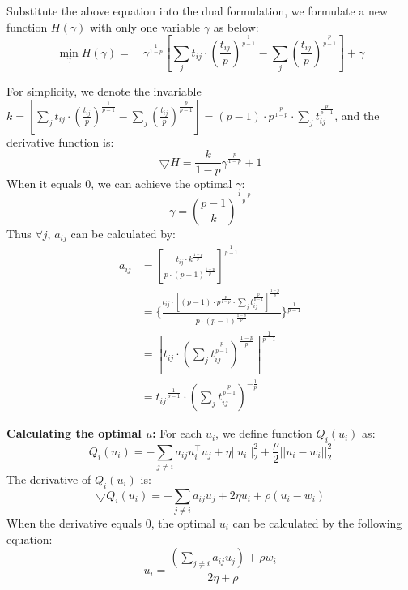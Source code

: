 {Substitute the above equation into the dual formulation, we formulate a new function $H(\gamma)$ with only one variable $\gamma$ as below:
\begin{equation}
    \min_{\gamma} H(\gamma) = \quad \gamma ^{\frac{1}{1-p}} [\sum_{j} t_{ij} \cdot (\frac{t_{ij}}{p})^{\frac{1}{p-1}} - \sum_{j} (\frac{t_{ij}}{p})^{\frac{p}{p-1}}] + \gamma
\end{equation}

For simplicity, we denote the invariable $k =  [\sum_{j} t_{ij} \cdot (\frac{t_{ij}}{p})^{\frac{1}{p-1}} - \sum_{j} (\frac{t_{ij}}{p})^{\frac{p}{p-1}}] = (p-1) \cdot p^{\frac{p}{1-p}} \cdot \sum_{j} t_{ij}^{\frac{p}{p-1}}$, and the derivative function is:
\begin{equation}
    \bigtriangledown H = \frac{k}{1-p} \gamma^{\frac{p}{1-p}} + 1
\end{equation}
When it equals $0$, we can achieve the optimal $\gamma$:
\begin{equation}
    \gamma = (\frac{p-1}{k})^{\frac{1-p}{p}}
\end{equation}
Thus $\forall j$, $a_{ij}$ can be calculated by:
\begin{equation}
\label{equation_update-ai}
\begin{split}
    a_{ij} & = [\frac{t_{ij}\cdot k^{\frac{1-p}{p}}}{p\cdot(p-1)^{\frac{1-p}{p}}}]^{\frac{1}{p-1}} \\
    & = \{\frac{t_{ij} \cdot [(p-1) \cdot p^{\frac{p}{1-p}} \cdot \sum_{j} t_{ij}^{\frac{p}{p-1}}]^{\frac{1-p}{p}}}{p\cdot(p-1)^{\frac{1-p}{p}}}\}^{\frac{1}{p-1}} \\
    & = [t_{ij} \cdot (\sum_{j} t_{ij}^{\frac{p}{p-1}})^{\frac{1-p}{p}}]^{\frac{1}{p-1}} \\
    & = {t_{ij}}^{\frac{1}{p-1}} \cdot (\sum_{j} t_{ij}^{\frac{p}{p-1}})^{-\frac{1}{p}}
\end{split}
\end{equation}


\textbf{Calculating the optimal $u$:} For each $u_i$, we define function $Q_i(u_i)$ as:
\begin{equation}
    Q_i(u_i) = - \sum_{j \neq i} a_{ij}u_{i}^{\top}u_{j} + \eta ||u_{i}||_{2}^{2} + \frac{\rho}{2} ||u_i - w_i||_{2}^{2}
\end{equation}
The derivative of $Q_i(u_i)$ is:
\begin{equation}
    \bigtriangledown Q_i(u_i) = - \sum_{j \neq i} a_{ij}u_j + 2\eta u_{i} + \rho (u_i - w_i)
\end{equation}
When the derivative equals $0$, the optimal $u_i$ can be calculated by the following equation:
\begin{equation}
\label{equation_update-ui}
    u_i =  \frac{(\sum_{j \neq i} a_{ij}u_j) + \rho w_i}{2\eta + \rho} 
\end{equation}

}
